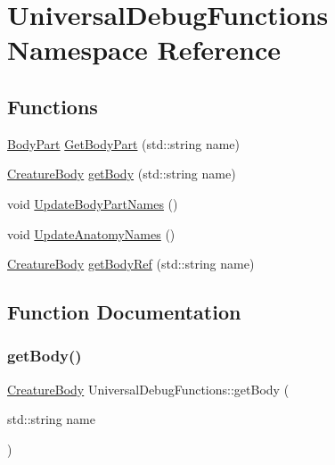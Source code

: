 \hypertarget{namespace_universal_debug_functions}{}\section{Universal\+Debug\+Functions Namespace Reference}
\label{namespace_universal_debug_functions}
\subsection*{Functions}
\begin{DoxyCompactItemize}
\item 
\mbox{\hyperlink{class_body_part}{Body\+Part}} \mbox{\hyperlink{namespace_universal_debug_functions_a6b25dc6d07d7ecd36501c946195b403d}{Get\+Body\+Part}} (std\+::string name)
\item 
\mbox{\hyperlink{class_creature_body}{Creature\+Body}} \mbox{\hyperlink{namespace_universal_debug_functions_a25b85b8c4e031a0e076f679acc405af8}{get\+Body}} (std\+::string name)
\item 
void \mbox{\hyperlink{namespace_universal_debug_functions_a069b66d16867ce9cdef140dc7b77f297}{Update\+Body\+Part\+Names}} ()
\item 
void \mbox{\hyperlink{namespace_universal_debug_functions_ab344b96caf2f2580133e89fe7af30e17}{Update\+Anatomy\+Names}} ()
\item 
\mbox{\hyperlink{class_creature_body}{Creature\+Body}} \mbox{\hyperlink{namespace_universal_debug_functions_a08ac83c95afab4a5d9828f0efd3b8249}{get\+Body\+Ref}} (std\+::string name)
\end{DoxyCompactItemize}


\subsection{Function Documentation}
\mbox{\label{namespace_universal_debug_functions_a25b85b8c4e031a0e076f679acc405af8}} 
\subsubsection{\texorpdfstring{get\+Body()}{getBody()}}
{\footnotesize\ttfamily \mbox{\hyperlink{class_creature_body}{Creature\+Body}} Universal\+Debug\+Functions\+::get\+Body (\begin{DoxyParamCaption}\item[{std\+::string}]{name }\end{DoxyParamCaption})}

